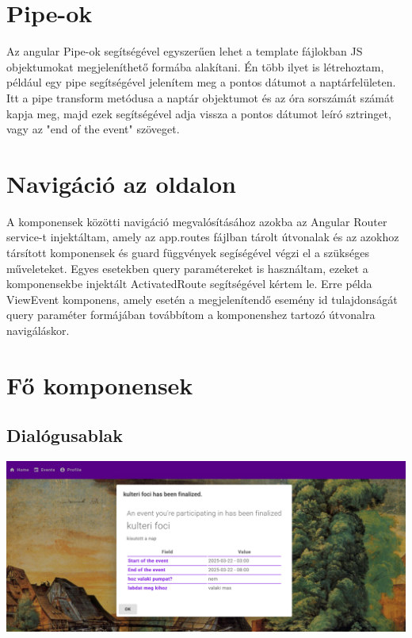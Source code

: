 \documentclass[a4paper,12pt]{report}
\theoremstyle{definition}
\theoremstyle{remark}
\begin{document}
\section{Pipe-ok}

Az angular Pipe-ok\cite{Pipewebsite} segítségével egyszerűen lehet a template fájlokban JS objektumokat megjeleníthető formába alakítani. Én több ilyet is létrehoztam, például egy pipe segítségével jelenítem meg a pontos dátumot a naptárfelületen. Itt a pipe transform metódusa a naptár objektumot és az óra sorszámát számát kapja meg, majd ezek segítségével adja vissza a pontos dátumot leíró sztringet, vagy az "end of the event" szöveget.

\section{Navigáció az oldalon}

A komponensek közötti navigáció megvalósításához azokba az Angular Router service-t\cite{Routerwebsite} injektáltam, amely az app.routes fájlban tárolt útvonalak és az azokhoz társított komponensek és guard függvények segíségével végzi el a szükséges műveleteket. Egyes esetekben query paramétereket is használtam, ezeket a komponensekbe injektált ActivatedRoute segítségével kértem le. Erre példa ViewEvent komponens, amely esetén a megjelenítendő esemény id tulajdonságát query paraméter formájában továbbítom a komponenshez tartozó útvonalra navigáláskor.

\section{Fő komponensek}

	\subsection{Dialógusablak}

\begin{center}
\includegraphics[width=150mm]{notification}
\captionsetup{width=0.8\linewidth}
\label{notification}
\end{center}
\end{document}
